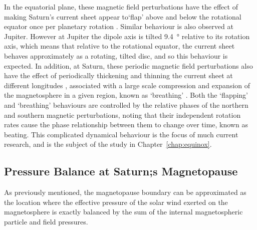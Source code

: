 In the equatorial plane, these magnetic field perturbations have the effect of making Saturn's current sheet appear to`flap' above and below the rotational equator once per planetary rotation \citep[e.g.][]{arridge2011}. Similar behaviour is also observed at Jupiter. However at Jupiter the dipole axis is tilted \SI{9.4}{\degree} relative to its rotation axis, which means that relative to the rotational equator, the current sheet behaves approximately as a rotating, tilted disc, and so this behaviour is expected. In addition, at Saturn, these periodic magnetic field perturbations also have the effect of periodically thickening and thinning the current sheet at different longitudes \citep{provan2012}, associated with a large scale compression and expansion of the magnetosphere in a given region, known as `breathing' \citep{ramer2016}. Both the `flapping' and `breathing' behaviours are controlled by the relative phases of the northern and southern magnetic perturbations, noting that their independent rotation rates cause the phase relationship between them to change over time, known as beating. This complicated dynamical behaviour is the focus of much current research, and is the subject of the study in Chapter~\ref{chap:equinox}.

\subsection{Pressure Balance at Saturn;s Magnetopause}\label{intro:sec:pbalance}
As previously mentioned, the magnetopause boundary can be approximated as the location where the effective pressure of the solar wind exerted on the magnetosphere is exactly balanced by the sum of the internal magnetospheric particle and field pressures. 


